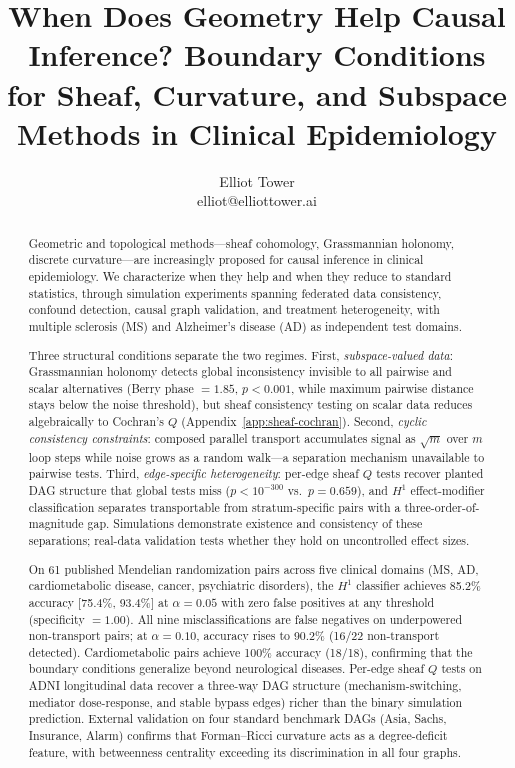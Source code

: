 \documentclass{article}
\title{When Does Geometry Help Causal Inference? Boundary Conditions for Sheaf, Curvature, and Subspace Methods in Clinical Epidemiology}
\author{\name Elliot Tower \\
      \email elliot@elliottower.ai}
\begin{document}
\maketitle

\begin{abstract}
Geometric and topological methods---sheaf cohomology, Grassmannian holonomy, discrete curvature---are increasingly proposed for causal inference in clinical epidemiology. We characterize when they help and when they reduce to standard statistics, through simulation experiments spanning federated data consistency, confound detection, causal graph validation, and treatment heterogeneity, with multiple sclerosis (MS) and Alzheimer's disease (AD) as independent test domains.

Three structural conditions separate the two regimes. First, \emph{subspace-valued data}: Grassmannian holonomy detects global inconsistency invisible to all pairwise and scalar alternatives (Berry phase $= 1.85$, $p < 0.001$, while maximum pairwise distance stays below the noise threshold), but sheaf consistency testing on scalar data reduces algebraically to Cochran's $Q$ (Appendix~\ref{app:sheaf-cochran}). Second, \emph{cyclic consistency constraints}: composed parallel transport accumulates signal as $\sqrt{m}$ over $m$ loop steps while noise grows as a random walk---a separation mechanism unavailable to pairwise tests. Third, \emph{edge-specific heterogeneity}: per-edge sheaf $Q$ tests recover planted DAG structure that global tests miss ($p < 10^{-300}$ vs.\ $p = 0.659$), and $H^1$ effect-modifier classification separates transportable from stratum-specific pairs with a three-order-of-magnitude gap. Simulations demonstrate existence and consistency of these separations; real-data validation tests whether they hold on uncontrolled effect sizes.

On 61 published Mendelian randomization pairs across five clinical domains (MS, AD, cardiometabolic disease, cancer, psychiatric disorders), the $H^1$ classifier achieves 85.2\% accuracy [75.4\%, 93.4\%] at $\alpha = 0.05$ with zero false positives at any threshold (specificity $= 1.00$). All nine misclassifications are false negatives on underpowered non-transport pairs; at $\alpha = 0.10$, accuracy rises to 90.2\% (16/22 non-transport detected). Cardiometabolic pairs achieve 100\% accuracy (18/18), confirming that the boundary conditions generalize beyond neurological diseases. Per-edge sheaf $Q$ tests on ADNI longitudinal data recover a three-way DAG structure (mechanism-switching, mediator dose-response, and stable bypass edges) richer than the binary simulation prediction. External validation on four standard benchmark DAGs (Asia, Sachs, Insurance, Alarm) confirms that Forman--Ricci curvature acts as a degree-deficit feature, with betweenness centrality exceeding its discrimination in all four graphs.


\end{abstract}
\end{document}

